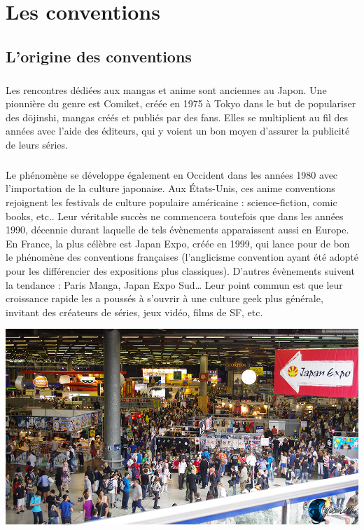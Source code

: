 \chapter{Les conventions}

\section{L'origine des conventions}

\paragraph{} Les rencontres dédiées aux mangas et anime sont anciennes au
Japon. Une pionnière du genre est Comiket, créée en 1975 à Tokyo dans le but de
populariser des d\=ojinshi, mangas créés et publiés par des fans. Elles se
multiplient au fil des années avec l’aide des éditeurs, qui y voient un bon
moyen d’assurer la publicité de leurs séries.

\paragraph{} Le phénomène se développe également en Occident dans les années
1980 avec l’importation de la culture japonaise. Aux États-Unis, ces anime
conventions rejoignent les festivals de culture populaire américaine :
science-fiction, comic books, etc.. Leur véritable succès ne commencera
toutefois que dans les années 1990, décennie durant laquelle de tels évènements
apparaissent aussi en Europe. En France, la plus célèbre est Japan Expo, créée
en 1999, qui lance pour de bon le phénomène des conventions françaises
(l’anglicisme convention ayant été adopté pour les différencier des expositions
plus classiques). D’autres évènements suivent la tendance : Paris Manga, Japan
Expo Sud… Leur point commun est que leur croissance rapide les a poussés à
s’ouvrir à une culture geek plus générale, invitant des créateurs de séries,
jeux vidéo, films de SF, etc.

\begin{center}
	\includegraphics[scale=0.3]{japanexpo.jpg}
\end{center}


